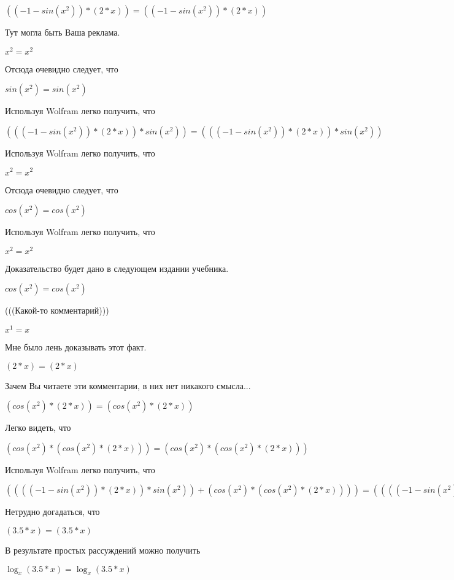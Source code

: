 \documentclass[12pt,a4paper,fleqn]{article}
\theoremstyle{definition}
\begin{document}
$(( -1  - sin({ x }^{ 2 })) * ( 2  *  x )) = (( -1  - sin({ x }^{ 2 })) * ( 2  *  x ))$

Тут могла быть Ваша реклама.

${ x }^{ 2 } = { x }^{ 2 }$

Отсюда очевидно следует, что

$sin({ x }^{ 2 }) = sin({ x }^{ 2 })$

Используя Wolfram легко получить, что

$((( -1  - sin({ x }^{ 2 })) * ( 2  *  x )) * sin({ x }^{ 2 })) = ((( -1  - sin({ x }^{ 2 })) * ( 2  *  x )) * sin({ x }^{ 2 }))$

Используя Wolfram легко получить, что

${ x }^{ 2 } = { x }^{ 2 }$

Отсюда очевидно следует, что

$cos({ x }^{ 2 }) = cos({ x }^{ 2 })$

Используя Wolfram легко получить, что

${ x }^{ 2 } = { x }^{ 2 }$

Доказательство будет дано в следующем издании учебника.

$cos({ x }^{ 2 }) = cos({ x }^{ 2 })$

(((Какой-то комментарий)))

${ x }^{ 1 } =  x $

Мне было лень доказывать этот факт.

$( 2  *  x ) = ( 2  *  x )$

Зачем Вы читаете эти комментарии, в них нет никакого смысла...

$(cos({ x }^{ 2 }) * ( 2  *  x )) = (cos({ x }^{ 2 }) * ( 2  *  x ))$

Легко видеть, что

$(cos({ x }^{ 2 }) * (cos({ x }^{ 2 }) * ( 2  *  x ))) = (cos({ x }^{ 2 }) * (cos({ x }^{ 2 }) * ( 2  *  x )))$

Используя Wolfram легко получить, что

$(((( -1  - sin({ x }^{ 2 })) * ( 2  *  x )) * sin({ x }^{ 2 })) + (cos({ x }^{ 2 }) * (cos({ x }^{ 2 }) * ( 2  *  x )))) = (((( -1  - sin({ x }^{ 2 })) * ( 2  *  x )) * sin({ x }^{ 2 })) + (cos({ x }^{ 2 }) * (cos({ x }^{ 2 }) * ( 2  *  x ))))$

Нетрудно догадаться, что

$( 3.5  *  x ) = ( 3.5  *  x )$

В результате простых рассуждений можно получить

$\log_{ x }{( 3.5  *  x )} = \log_{ x }{( 3.5  *  x )}$
\end{document}
